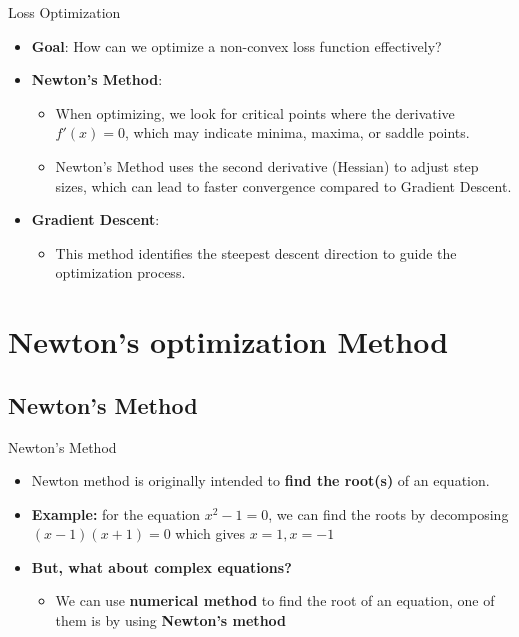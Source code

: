 \documentclass[serif, aspectratio=169]{beamer}
\begin{document}
\begin{frame}{Loss Optimization}
    \begin{itemize}
        \item \textbf{Goal}: How can we optimize a non-convex loss function effectively?
        \item \textbf{Newton's Method}:
        \begin{itemize}
            \item When optimizing, we look for critical points where the derivative \( f'(x) = 0 \), which may indicate minima, maxima, or saddle points.
            \item Newton's Method uses the second derivative (Hessian) to adjust step sizes, which can lead to faster convergence compared to Gradient Descent.
        \end{itemize}
        \item \textbf{Gradient Descent}:
        \begin{itemize}
            \item This method identifies the steepest descent direction to guide the optimization process.
        \end{itemize}
    \end{itemize}
\end{frame}

\section{Newton's optimization Method}
\subsection{Newton's Method}
\begin{frame}{Newton's Method}
\begin{itemize}
    \item Newton method is originally intended to \textbf{find the root(s)} of an equation.
    \item \textbf{Example:} for the equation $x^2 - 1 = 0$, we can find the roots by decomposing $(x-1)(x+1)=0$ which gives $x=1, x=-1$
    \item \textbf{But, what about complex equations?}
    \begin{itemize}
        \item We can use \textbf{numerical method} to find the root of an equation, one of them is by using \textbf{Newton’s method}
    \end{itemize}
\end{itemize}
\end{frame}
\end{document}
